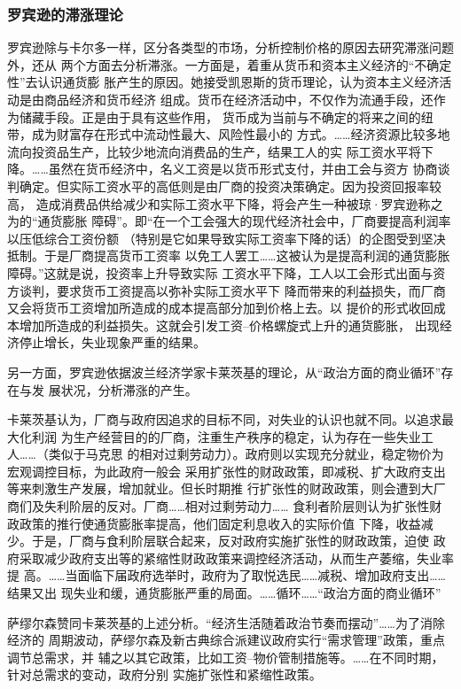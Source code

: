 \subsubsection{罗宾逊的滞涨理论}

罗宾逊除与卡尔多一样，区分各类型的市场，分析控制价格的原因去研究滞涨问题外，还从
两个方面去分析滞涨。一方面是，着重从货币和资本主义经济的“不确定性”去认识通货膨
胀产生的原因。她接受凯恩斯的货币理论，认为资本主义经济活动是由商品经济和货币经济
组成。货币在经济活动中，不仅作为流通手段，还作为储藏手段。正是由于具有这些作用，
货币成为当前与不确定的将来之间的纽带，成为财富存在形式中流动性最大、风险性最小的
方式。……经济资源比较多地流向投资品生产，比较少地流向消费品的生产，结果工人的实
际工资水平将下降。……虽然在货币经济中，名义工资是以货币形式支付，并由工会与资方
协商谈判确定。但实际工资水平的高低则是由厂商的投资决策确定。因为投资回报率较高，
造成消费品供给减少和实际工资水平下降，将会产生一种被琼·罗宾逊称之为的“通货膨胀
障碍”。即“在一个工会强大的现代经济社会中，厂商要提高利润率以压低综合工资份额
（特别是它如果导致实际工资率下降的话）的企图受到坚决抵制。于是厂商提高货币工资率
以免工人罢工……这被认为是提高利润的通货膨胀障碍。”这就是说，投资率上升导致实际
工资水平下降，工人以工会形式出面与资方谈判，要求货币工资提高以弥补实际工资水平下
降而带来的利益损失，而厂商又会将货币工资增加所造成的成本提高部分加到价格上去。以
提价的形式收回成本增加所造成的利益损失。这就会引发工资--价格螺旋式上升的通货膨胀，
出现经济停止增长，失业现象严重的结果。

另一方面，罗宾逊依据波兰经济学家卡莱茨基的理论，从“政治方面的商业循环”存在与发
展状况，分析滞涨的产生。

卡莱茨基认为，厂商与政府因追求的目标不同，对失业的认识也就不同。以追求最大化利润
为生产经营目的的厂商，注重生产秩序的稳定，认为存在一些失业工人……（类似于马克思
的相对过剩劳动力）。政府则以实现充分就业，稳定物价为宏观调控目标，为此政府一般会
采用扩张性的财政政策，即减税、扩大政府支出等来刺激生产发展，增加就业。但长时期推
行扩张性的财政政策，则会遭到大厂商们及失利阶层的反对。厂商……相对过剩劳动力……
食利者阶层则认为扩张性财政政策的推行使通货膨胀率提高，他们固定利息收入的实际价值
下降，收益减少。于是，厂商与食利阶层联合起来，反对政府实施扩张性的财政政策，迫使
政府采取减少政府支出等的紧缩性财政政策来调控经济活动，从而生产萎缩，失业率提
高。……当面临下届政府选举时，政府为了取悦选民……减税、增加政府支出……结果又出
现失业和缓，通货膨胀严重的局面。……循环……“政治方面的商业循环”

萨缪尔森赞同卡莱茨基的上述分析。“经济生活随着政治节奏而摆动”……为了消除经济的
周期波动，萨缪尔森及新古典综合派建议政府实行“需求管理”政策，重点调节总需求，并
辅之以其它政策，比如工资--物价管制措施等。……在不同时期，针对总需求的变动，政府分别
实施扩张性和紧缩性政策。


